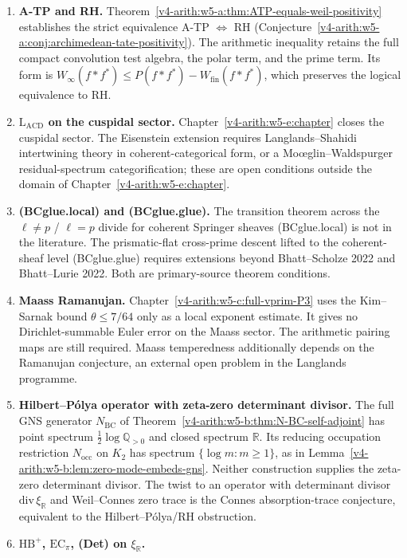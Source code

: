 \begin{enumerate}
\item \textbf{A-TP and RH.}
Theorem~\ref{v4-arith:w5-a:thm:ATP-equals-weil-positivity} establishes the
strict equivalence A-TP \(\Leftrightarrow\) RH
(Conjecture~\ref{v4-arith:w5-a:conj:archimedean-tate-positivity}). The
arithmetic inequality retains the full compact convolution test
algebra, the polar term, and the prime term. Its form is
\(W_\infty(f*f^*)\le P(f*f^*)-W_{\mathrm{fin}}(f*f^*)\),
which preserves the logical equivalence to RH.
\item \textbf{\(\mathrm{L}_{\mathrm{ACD}}\) on the cuspidal sector.}
Chapter~\ref{v4-arith:w5-e:chapter} closes the cuspidal sector. The Eisenstein extension
requires Langlands--Shahidi intertwining theory in coherent-categorical
form, or a Mo{\oe}glin--Waldspurger residual-spectrum
categorification; these are open conditions outside the domain of
Chapter~\ref{v4-arith:w5-e:chapter}.
\item \textbf{(BCglue.local) and (BCglue.glue).}
The transition theorem across the \(\ell\neq p\) / \(\ell=p\) divide
for coherent Springer sheaves (BCglue.local) is not in the literature.
The prismatic-flat cross-prime descent lifted to the coherent-sheaf
level (BCglue.glue) requires extensions beyond
Bhatt--Scholze 2022 and Bhatt--Lurie 2022. Both are primary-source
theorem conditions.
\item \textbf{Maass Ramanujan.}
Chapter~\ref{v4-arith:w5-c:full-vprim-P3} uses the Kim--Sarnak bound \(\theta \leq 7/64\) only as a
local exponent estimate. It gives no Dirichlet-summable Euler error on
the Maass sector. The arithmetic pairing maps are still required. Maass temperedness
additionally depends on the Ramanujan conjecture, an external open problem in the Langlands
programme.
\item \textbf{Hilbert--P\'{o}lya operator with zeta-zero determinant divisor.}
The full GNS generator \(N_{\mathrm{BC}}\) of
Theorem~\ref{v4-arith:w5-b:thm:N-BC-self-adjoint} has point spectrum
\(\tfrac12\log\mathbb Q_{>0}\) and closed spectrum \(\mathbb R\).
Its reducing occupation restriction \(N_{\mathrm{occ}}\) on \(K_2\)
has spectrum \(\{\log m:m\ge1\}\), as in
Lemma~\ref{v4-arith:w5-b:lem:zero-mode-embeds-gns}.
Neither construction supplies the zeta-zero determinant divisor.
The twist to an operator with determinant divisor
\(\mathrm{div}\,\xi_{\mathbb R}\) and Weil--Connes zero trace is the
Connes absorption-trace conjecture, equivalent to the
Hilbert--P\'olya/RH obstruction.
\item \textbf{\(\mathrm{HB}^{+}\), \(\mathrm{EC}_\pi\), (Det) on \(\xi_{\mathbb{R}}\).}

\end{enumerate}
